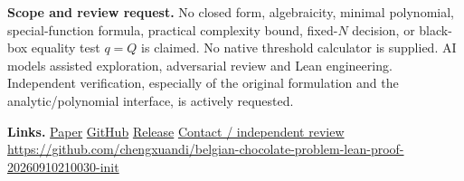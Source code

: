 \documentclass[10pt,a4paper]{article}
\newcommand{\repo}{https://github.com/chengxuandi/belgian-chocolate-problem-lean-proof-20260910210030-init}
\begin{document}
\textbf{Scope and review request.}
No closed form, algebraicity, minimal polynomial, special-function formula,
practical complexity bound, fixed-$N$ decision, or black-box equality test
$q=Q$ is claimed. No native threshold calculator is supplied.
AI models assisted exploration, adversarial review and Lean engineering.
Independent verification, especially of the original formulation and the
analytic/polynomial interface, is actively requested.

\textbf{Links.}\quad
\href{\repo/blob/v1.0.0-proof-candidate/output/pdf/GBCP_Final_Manuscript.pdf}{Paper}\quad
\href{\repo}{GitHub}\quad
\href{\repo/releases/tag/v1.0.0-proof-candidate}{Release}\quad
\href{\repo/issues}{Contact / independent review}\\
{\footnotesize\url{https://github.com/chengxuandi/belgian-chocolate-problem-lean-proof-20260910210030-init}}
\end{document}
